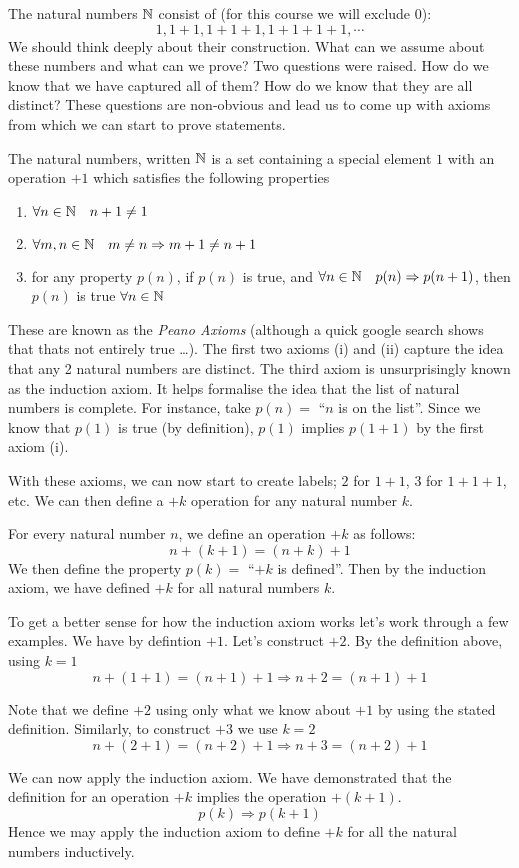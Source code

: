 \documentclass{article}
\begin{document}
The natural numbers $\mathbb{N}$ consist of (for this course we will exclude 0):
\[
    1, 1+1, 1+1+1, 1+1+1+1, \cdots 
\]
We should think deeply about their construction. What can we assume about these numbers and what can we prove? Two questions were raised. How do we know that we have captured all of them? How do we know that they are all distinct? These questions are non-obvious and lead us to come up with axioms from which we can start to prove statements.

\begin{defi}
    The natural numbers, written $\mathbb{N}$ is a set containing a special element $1$ with an operation $+1$ which satisfies the following properties
    \begin{enumerate}
        \item $\forall n \in \mathbb{N} \quad n+1 \neq 1$
        \item $\forall m, n \in \mathbb{N} \quad  m \neq n \Rightarrow m + 1 \neq n + 1$
        \item for any property $p(n)$, if $p(n)$ is true, and $\forall n \in \mathbb{N} \quad p(n) \Rightarrow p(n + 1)$, then $p(n)$ is true $\forall n \in \mathbb{N}$
    \end{enumerate}
\end{defi}

These are known as the \emph{Peano Axioms} (although a quick google search shows that thats not entirely true \ldots). The first two axioms (i) and (ii) capture the idea that any 2 natural numbers are distinct. The third axiom is unsurprisingly known as the induction axiom. It helps formalise the idea that the list of natural numbers is complete. For instance, take $p(n) = $ ``$n$ is on the list''. Since we know that $p(1)$ is true (by definition), $p(1)$ implies $p(1 + 1)$ by the first axiom (i).

With these axioms, we can now start to create labels; $2$ for $1 + 1$, $3$ for $1 + 1 + 1$, etc. We can then define a $+k$ operation for any natural number $k$.

\begin{defi}[$+k$]
    For every natural number $n$, we define an operation $+k$ as follows:
    \[
        n + (k + 1) = (n + k) + 1
    \]
    We then define the property $p(k) = $ ``$+k$ is defined''. Then by the induction axiom, we have defined $+k$ for all natural numbers $k$.
\end{defi}

To get a better sense for how the induction axiom works let's work through a few examples. We have by defintion $+1$. Let's construct $+2$. By the definition above, using $k = 1$
\[
    n + (1 + 1) = (n + 1) + 1 \Rightarrow n + 2 = (n + 1) + 1
\]

Note that we define $+2$ using only what we know about $+1$ by using the stated definition. Similarly, to construct $+3$ we use $k = 2$
\[
    n + (2 + 1) = (n + 2) + 1 \Rightarrow n + 3 = (n + 2) + 1
\]

We can now apply the induction axiom. We have demonstrated that the definition for an operation $+k$ implies the operation $+(k + 1)$.
\[
    p(k) \Rightarrow p(k + 1)
\]
Hence we may apply the induction axiom to define $+k$ for all the natural numbers inductively.
\end{document}
